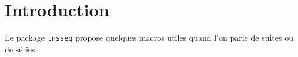 \documentclass[12pt,a4paper]{article}
\begin{document}
\section{Introduction}

Le package \verb+tnsseq+ propose quelques macros utiles quand l'on parle de suites ou de séries.
\end{document}

